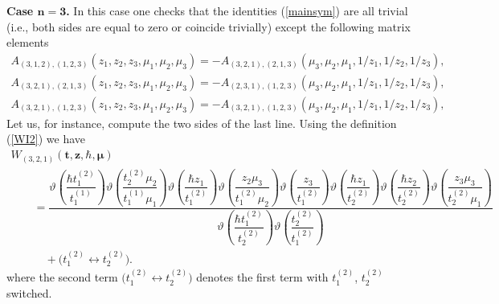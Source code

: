 \documentclass[10pt,a4paper]{amsart}
\def\ttt{{\boldsymbol t}}
\def\zz{{\boldsymbol z}}
\def\mub{{\boldsymbol\mu}}
\let\thi\vartheta
\numberwithin{equation}{section}
\begin{document}
\textbf{Case $\boldsymbol{n=3}$.} In this case one checks that the identities (\ref{mainsym}) are all trivial (i.e., both sides are equal to zero or coincide trivially) except the following matrix elements
\begin{gather*}
A_{(3, 1, 2), (1, 2, 3)}(z_1,z_2,z_3,\mu_1,\mu_2,\mu_3) = - A_{(3, 2, 1), (2, 1, 3)}(\mu_3,\mu_2,\mu_1,1/z_1,1/z_2,1/z_3),\\
A_{(3, 2, 1), (2, 1, 3)}(z_1,z_2,z_3,\mu_1,\mu_2,\mu_3) = -A_{(2, 3, 1), (1, 2, 3)}(\mu_3,\mu_2,\mu_1,1/z_1,1/z_2,1/z_3),\\
A_{(3, 2, 1), (1, 2, 3)}(z_1,z_2,z_3,\mu_1,\mu_2,\mu_3) =- A_{(3, 2, 1), (1, 2, 3)}(\mu_3,\mu_2,\mu_1,1/z_1,1/z_2,1/z_3),
\end{gather*}
Let us, for instance, compute the two sides of the last line. Using the definition (\ref{WI2}) we have
\begin{gather*}
W_{(3, 2, 1)}(\ttt,\zz,\hbar,\mub)\\
\qquad{}= \dfrac{\thi\! \left( \dfrac {\hbar t_1^{(2)}}{t_1^{(1)}} \right) \thi\! \left( {
 \dfrac {t_2^{(2)} \mu_{{2}}}{t^{(1)}_1 \mu_{{1}}}} \right) \thi\! \left(
 {\dfrac {\hbar z_{{1}}}{t^{(2)}_1 }} \right) \thi\! \left( {\dfrac {z_{{2}} \mu
 _{{3}}}{t^{(2)}_1 \mu_{{2}}}} \right) \thi\! \left( {\dfrac {z_{{3}}}{t^{(2)}_1 }} \right) \thi\! \left( {\dfrac {\hbar z_{{1}}}{t^{(2)}_2 }} \right)
 \thi\! \left( {\dfrac {\hbar z_{{2}}}{t^{(2)}_2 }} \right) \thi\! \left( {
 \dfrac {z_{{3}}\mu_{{3}}}{t^{(2)}_2 \mu_{{1}}}} \right)
}{\thi\! \left( {\dfrac {\hbar t^{(2)}_1 }{t^{(2)}_2 }} \right) \thi\! \left( { \dfrac {t^{(2)}_2 }{t^{(2)}_1 }} \right)} \\
\qquad\quad{} + \big( t^{(2)}_1 \leftrightarrow t^{(2)}_2 \big).
\end{gather*}
where the second term $\big( t^{(2)}_1 \leftrightarrow t^{(2)}_2 \big)$ denotes the first term with $t^{(2)}_1$, $t^{(2)}_2$ switched.
\end{document}

